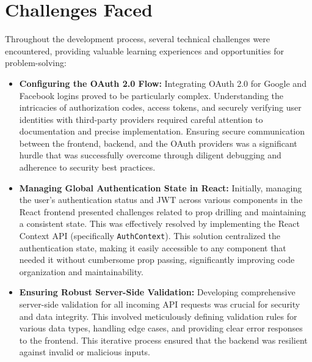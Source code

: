 \documentclass{report}
\begin{document}
\section{Challenges Faced}
\label{sec:challenges_faced}
Throughout the development process, several technical challenges were encountered, providing valuable learning experiences and opportunities for problem-solving:
\begin{itemize}
    \item \textbf{Configuring the OAuth 2.0 Flow:} Integrating OAuth 2.0 for Google and Facebook logins proved to be particularly complex. Understanding the intricacies of authorization codes, access tokens, and securely verifying user identities with third-party providers required careful attention to documentation and precise implementation. Ensuring secure communication between the frontend, backend, and the OAuth providers was a significant hurdle that was successfully overcome through diligent debugging and adherence to security best practices.
    \item \textbf{Managing Global Authentication State in React:} Initially, managing the user's authentication status and JWT across various components in the React frontend presented challenges related to prop drilling and maintaining a consistent state. This was effectively resolved by implementing the React Context API (specifically \texttt{AuthContext}). This solution centralized the authentication state, making it easily accessible to any component that needed it without cumbersome prop passing, significantly improving code organization and maintainability.
    \item \textbf{Ensuring Robust Server-Side Validation:} Developing comprehensive server-side validation for all incoming API requests was crucial for security and data integrity. This involved meticulously defining validation rules for various data types, handling edge cases, and providing clear error responses to the frontend. This iterative process ensured that the backend was resilient against invalid or malicious inputs.
\end{itemize}
\end{document}
